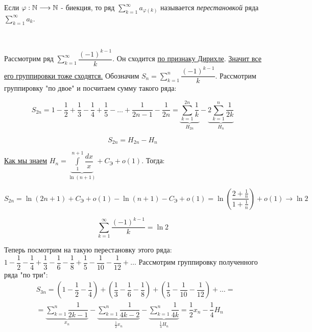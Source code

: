 \documentclass[../main.tex]{subfiles}
\begin{document}
Если \( \varphi : \mathbb{N} \longrightarrow \mathbb{N}\) - биекция, то ряд \( \sum\limits_{ k=1}^{ \infty } a_{ \varphi \left( k\right)}\) называется \emph{перестановкой} ряда \( \sum\limits_{ k=1}^{ \infty } a_k\). 

\begin{example}
    
    ~

    Рассмотрим ряд \( \sum\limits_{ k=1}^{ \infty } \dfrac{ (-1)^{k-1}}{ k} \). Он сходится \hyperlink{thm:series_dirihle}{по признаку Дирихле}. \hyperlink{thm:series_group}{Значит все его группировки тоже сходятся.} Обозначим \( S_n= \sum\limits_{ k=1}^{ n} \dfrac{ \left(-1\right)^{k-1}}{ k} \). Рассмотрим группировку "по двое" и посчитаем сумму такого ряда:

    \[ S_{2n}=1 - \dfrac{ 1}{ 2} + \dfrac{ 1}{ 3} - \dfrac{ 1}{ 4} + \dfrac{ 1}{ 5} - \ldots + \dfrac{ 1}{ 2n-1} - \dfrac{ 1}{ 2n}= \underbrace{\sum\limits_{ k=1}^{ 2n} \dfrac{ 1}{ k}}_{H_{2n}} - \underbrace{2\sum\limits_{ k=1}^{ n} \dfrac{ 1}{ 2k}}_{H_n}\]

    \[ S_{2n}=H_{2n}-H_n\]

    \hyperlink{ex:harmonic_sim}{Как мы знаем} \( H_n = \underbrace{\displaystyle\int\limits_{ 1}^{ n+1} \dfrac{ dx}{ x} }_{ \ln \left( n+1\right)}+C_{\textrm{Э}}+o\left( 1\right) \). Тогда:

    \[ S_{2n}= \ln \left( 2n+1\right)+C_{\textrm{Э}}+o\left( 1\right)- \ln \left( n+1\right)-C_{\textrm{Э}}+o\left( 1\right)= \ln \left( \dfrac{ 2+\frac{1}{n}}{ 1+ \frac{ 1}{ n} }\right) + o\left( 1\right) \longrightarrow \ln 2\]

    \[ \boxed{ \sum\limits_{ k=1}^{ \infty } \dfrac{ \left(-1\right)^{k-1}}{ k} = \ln 2}\]

    Теперь посмотрим на такую перестановку этого ряда: \( 1 - \dfrac{ 1}{ 2} - \dfrac{ 1}{ 4} + \dfrac{ 1}{ 3} - \dfrac{ 1}{ 6} - \dfrac{ 1}{ 8} + \dfrac{ 1}{ 5} - \dfrac{ 1}{ 10} - \dfrac{ 1}{ 12} + \ldots \) Рассмотрим группировку полученного ряда "по три":
    \begin{equation*}
        \begin{aligned}
            & S_{3n}= \left( 1 - \dfrac{ 1}{ 2} - \dfrac{ 1}{ 4} \right)+ \left(\dfrac{ 1}{ 3} - \dfrac{ 1}{ 6} - \dfrac{ 1}{ 8}\right) + \left(\dfrac{ 1}{ 5} - \dfrac{ 1}{ 10} - \dfrac{ 1}{ 12}\right) + \ldots = \\ 
            & = \underbrace{\sum\limits_{ k=1}^{ n} \dfrac{ 1}{ 2k-1}}_{x_n} - \underbrace{\sum\limits_{ k=1}^{ n} \dfrac{ 1}{ 4k-2}}_{ \frac{ 1}{ 2}x_n } - \underbrace{\sum\limits_{ k=1}^{ n} \dfrac{ 1}{ 4k} }_{ \frac{ 1}{ 4}H_n}= \dfrac{ 1}{ 2} x_n- \dfrac{ 1}{ 4} H_n
        \end{aligned}
    \end{equation*}


\end{example}
\end{document}
